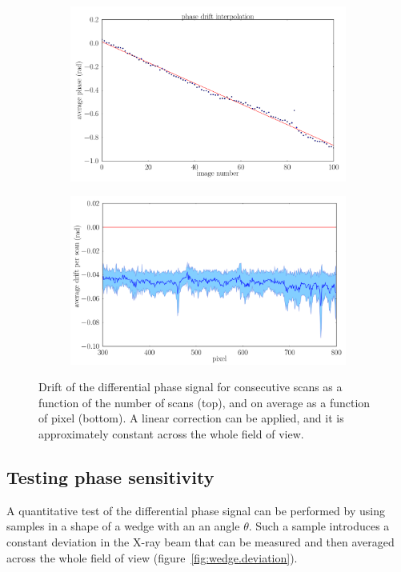 \begin{figure}[htb]
    \centering
    \begin{subfigure}[b]{.75\textwidth}
        \includegraphics[width=\textwidth]{gfx/mythen-edge-on/drift_fit.png}
        \caption{}
    \end{subfigure}
    \begin{subfigure}[b]{.75\textwidth}
        \includegraphics[width=\textwidth]{gfx/mythen-edge-on/drift_pixels.png}
        \caption{}
    \end{subfigure}
    \caption[Drift of the differential phase signal]{Drift of the differential phase signal for consecutive scans as
    a function of the number of scans (top), and on average as a function
of pixel (bottom). A linear correction can be applied, and it is
approximately constant across the whole field of view.}
    \label{fig:phase.drift}
\end{figure}

\subsection{Testing phase sensitivity}\label{sec:phase-sensitivity}
A quantitative test of the differential phase signal can be performed by
using samples in a shape of a wedge with an an angle $\theta$. Such a sample
introduces a constant deviation in the X-ray beam that can be measured and
then averaged across the whole field of view
(figure~\ref{fig:wedge.deviation}).

